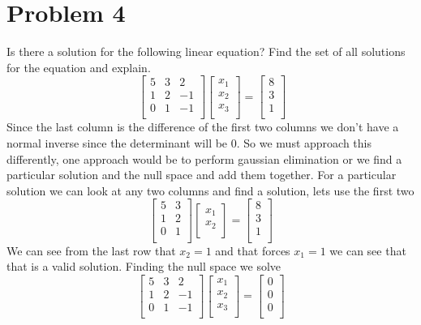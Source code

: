 \documentclass{article}
\begin{document}
\section*{Problem 4}
Is there a solution for the following linear equation?
Find the set of all solutions for the equation and explain.
$$\
\begin{bmatrix}
5 & 3 & 2 \\
1 & 2 & -1 \\
0 & 1 & -1 \\
\end{bmatrix}
\begin{bmatrix}
x_1 \\
x_2 \\
x_3 \\
\end{bmatrix}
=
\begin{bmatrix}
8 \\
3 \\
1 \\
\end{bmatrix}
$$
\newline
Since the last column is the difference of the first two columns we don't have a normal inverse since the determinant will be 0.
So we must approach this differently, one approach would be to perform gaussian elimination or we find a particular solution and the null space and add them together.
For a particular solution we can look at any two columns and find a solution, lets use the first two
$$
\begin{bmatrix}
5 & 3 \\
1 & 2 \\
0 & 1 \\
\end{bmatrix}
\begin{bmatrix}
x_1 \\
x_2 \\
\end{bmatrix}
=
\begin{bmatrix}
8 \\
3 \\
1 \\
\end{bmatrix}
$$
We can see from the last row that $x_2 = 1$ and that forces $x_1 = 1$ we can see that that is a valid solution.
Finding the null space we solve
$$
\begin{bmatrix}
5 & 3 & 2 \\
1 & 2 & -1 \\
0 & 1 & -1 \\
\end{bmatrix}
\begin{bmatrix}
x_1 \\
x_2 \\
x_3 \\
\end{bmatrix}
=
\begin{bmatrix}
0 \\
0 \\
0 \\
\end{bmatrix}
$$
\end{document}
